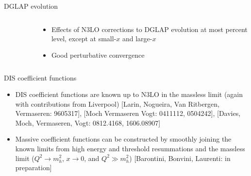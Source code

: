 \documentclass[aspectratio=169, 9pt,t]{beamer}
\begin{document}
\begin{frame}{DGLAP evolution}
\begin{columns}
\begin{column}{0.59\textwidth}
\begin{figure}[!t]
      \end{figure}
    \end{column}
    \begin{column}{0.39\textwidth}
      \begin{itemize}
        \item Effects of N3LO corrections to DGLAP evolution at most percent level, except at small-$x$ and large-$x$
        \item Good perturbative convergence
      \end{itemize}
    \end{column}
  \end{columns}
\end{frame}

\begin{frame}{DIS coefficient functions}
  \begin{itemize}
    \item DIS coefficient functions are known up to N3LO in the massless limit (again with contributions from Liverpool) {\color{gray}\small [Larin, Nogueira, Van Ritbergen, Vermaseren: 9605317], [Moch Vermaseren Vogt: 0411112, 0504242], [Davies, Moch, Vermaseren, Vogt: 0812.4168, 1606.08907]}
    \item Massive coefficient functions can be constructed by smoothly joining the known limits from high energy and threshold resummations and the massless limit ($Q^2 \rightarrow m_h^2$, $x\rightarrow 0$, and $Q^2\gg m_h^2$) {\color{gray}\small [Barontini, Bonvini, Laurenti: in preparation]}
  \end{itemize}


\end{frame}
\end{document}
